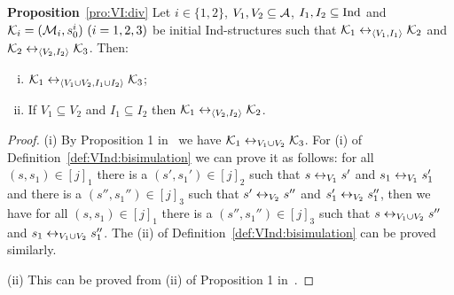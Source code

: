 \documentclass[letterpaper]{article} %
\begin{document}
\noindent\textbf{Proposition}~\ref{pro:VI:div}
Let $i\in \{1,2\}$, $V_1,V_2\subseteq\cal A$, $I_1, I_2 \subseteq \textrm{Ind}$
and ${\cal K}_i=({\cal M}_i,s_0^i)~(i=1,2,3)$ be initial Ind-structures
 such that
${\cal K}_1\leftrightarrow_{{\langle{V_1, I_1}\rangle}}{\cal K}_2$ and ${\cal K}_2\leftrightarrow_{{\langle{V_2,I_2}\rangle}}{\cal K}_3$.
 Then:
 \begin{enumerate}[(i)]
   \item ${\cal K}_1\leftrightarrow_{{\langle{V_1\cup V_2, I_1 \cup I_2}\rangle}}{\cal K}_3$;
   \item If $V_1 \subseteq V_2$ and $I_1 \subseteq I_2$ then ${\cal K}_1 \leftrightarrow_{{\langle{V_2, I_2}\rangle}} {\cal K}_2$.
 \end{enumerate}
\begin{proof}
(i) By Proposition 1 in~\cite{renyansfirstpaper} we have ${\cal K}_1\leftrightarrow_{V_1\cup V_2}{\cal K}_3$. For (i) of Definition~\ref{def:VInd:bisimulation} we can prove it as follows:
for all $(s,s_1) \in [j]_1$ there is a $(s', s_1') \in [j]_2$ such that $s\leftrightarrow_{V_1} s'$ and $s_1 \leftrightarrow_{V_1} s_1'$ and there is a $(s'', s_1'') \in [j]_3$ such that $s'\leftrightarrow_{V_2} s''$ and $s_1' \leftrightarrow_{V_2} s_1''$,  then we have for all $(s,s_1) \in [j]_1$ there is a $(s'', s_1'') \in [j]_3$ such that $s  \leftrightarrow_{V_1\cup V_2} s''$ and $s_1 \leftrightarrow_{V_1\cup V_2} s_1''$. The (ii) of Definition~\ref{def:VInd:bisimulation} can be proved similarly.

(ii) This can be proved from (ii) of Proposition 1 in~\cite{renyansfirstpaper}.
\end{proof}
\end{document}
